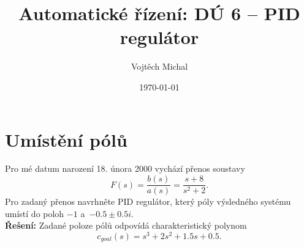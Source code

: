 \documentclass[twoside]{article}
\title{Automatické řízení: DÚ 6 -- PID regulátor}
\author{Vojtěch Michal}
\date{\today}
\begin{document}
\maketitle

\section{Umístění pólů}

Pro mé datum narození 18. února 2000 vychází přenos soustavy
\begin{equation}
	F(s) = \frac{b(s)}{a(s)} = \frac{s+8} {s^2 + 2}.
\end{equation}
Pro zadaný přenos navrhněte PID regulátor, který póly výsledného systému umístí
do poloh $-1$ a~$-0.5 \pm 0.5 i$. \\
\textbf{Řešení:}
Zadané poloze pólů odpovídá charakteristický polynom
\begin{equation}
	c_{goal}(s) = s^3 + 2s^2 + 1.5 s + 0.5.
	\label{eq:goal}
\end{equation}
\end{document}
